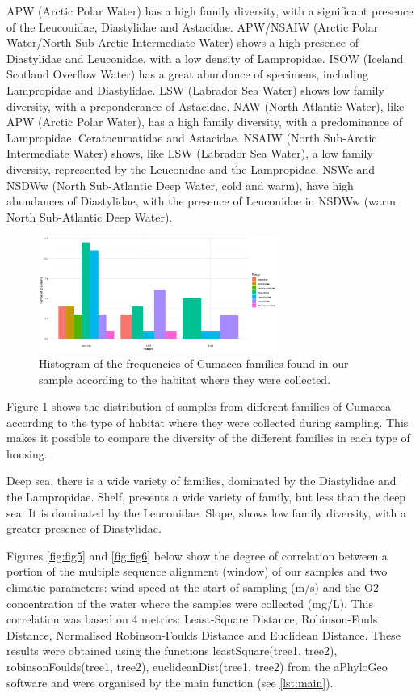 APW (Arctic Polar Water) has a high family diversity, with a significant presence of the Leuconidae, Diastylidae and Astacidae. APW/NSAIW (Arctic Polar Water/North Sub-Arctic Intermediate Water) shows a high presence of Diastylidae and Leuconidae, with a low density of Lampropidae. ISOW (Iceland Scotland Overflow Water) has a great abundance of specimens, including Lampropidae and  Diastylidae. LSW (Labrador Sea Water) shows low family diversity, with a preponderance of Astacidae. NAW (North Atlantic Water), like APW (Arctic Polar Water), has a high family diversity, with a predominance of Lampropidae, Ceratocumatidae and Astacidae. NSAIW (North Sub-Arctic Intermediate Water) shows, like LSW (Labrador Sea Water), a low family diversity, represented by the Leuconidae and the Lampropidae. NSWc and NSDWw (North Sub-Atlantic Deep Water, cold and warm), have high abundances of Diastylidae, with the presence of Leuconidae in NSDWw (warm North Sub-Atlantic Deep Water).

\begin{figure}[]
    \centering
    \includegraphics[width=0.7\textwidth]{figure4.png}
    \caption{Histogram of the frequencies of Cumacea families found in our sample according to the habitat where they were collected.\label{fig:fig4}}
\end{figure}

Figure \ref{fig:fig4} shows the distribution of samples from different families of Cumacea according to the type of habitat where they were collected during sampling. This makes it possible to compare the diversity of the different families in each type of housing.

Deep sea, there is a wide variety of families, dominated by the Diastylidae and the Lampropidae. Shelf, presents a wide variety of family, but less than the deep sea. It is dominated by the Leuconidae. Slope, shows low family diversity, with a greater presence of Diastylidae. 

Figures \ref{fig:fig5} and \ref{fig:fig6} below show the degree of correlation between a portion of the multiple sequence alignment (window) of our samples and two climatic parameters: wind speed at the start of sampling (m/s) and the O2 concentration of the water where the samples were collected (mg/L). This correlation was based on 4 metrics: Least-Square Distance, Robinson-Fouls Distance, Normalised Robinson-Foulds Distance and Euclidean Distance. These results were obtained using the functions leastSquare(tree1, tree2), robinsonFoulds(tree1, tree2), euclideanDist(tree1, tree2) from the aPhyloGeo software and were organised by the main function (see \autoref{lst:main}). 

